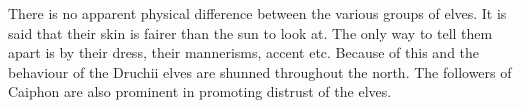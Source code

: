 \documentclass[a4paper]{dnd5}
\begin{document}
There is no apparent physical difference between the various groups of elves.  It is said that their skin is fairer than the sun to look at. The only way to tell them apart is by their dress, their mannerisms, accent etc.  Because of this and the behaviour of the Druchii elves are shunned throughout the north.  The followers of Caiphon are also prominent in promoting distrust of the elves.
\end{document}
